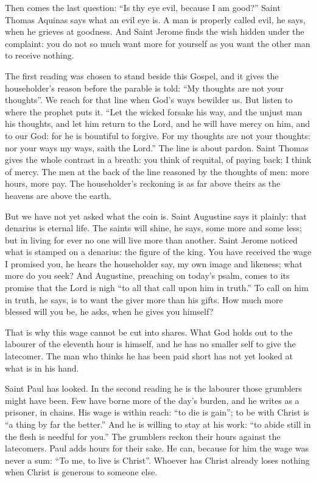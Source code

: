 Then comes the last question: ``Is thy eye evil, because I am good?'' Saint
Thomas Aquinas says what an evil eye is. A man is properly called evil, he
says, when he grieves at goodness. And Saint Jerome finds the wish hidden
under the complaint: you do not so much want more for yourself as you want
the other man to receive nothing.

\bigskip

The first reading was chosen to stand beside this Gospel, and it gives the
householder's reason before the parable is told: ``My thoughts are not your
thoughts''. We reach for that line when God's ways bewilder us. But listen to
where the prophet puts it. ``Let the wicked forsake his way, and the unjust
man his thoughts, and let him return to the Lord, and he will have mercy on
him, and to our God: for he is bountiful to forgive. For my thoughts are not
your thoughts: nor your ways my ways, saith the Lord.'' The line is about
pardon. Saint Thomas gives the whole contrast in a breath: you think of
requital, of paying back; I think of mercy. The men at the back of the line
reasoned by the thoughts of men: more hours, more pay. The householder's
reckoning is as far above theirs as the heavens are above the earth.

\bigskip

But we have not yet asked what the coin is. Saint Augustine says it plainly:
that denarius is eternal life. The saints will shine, he says, some more and
some less; but in living for ever no one will live more than another. Saint
Jerome noticed what is stamped on a denarius: the figure of the king. You
have received the wage I promised you, he hears the householder say, my own
image and likeness; what more do you seek? And Augustine, preaching on
today's psalm, comes to its promise that the Lord is nigh ``to all that call
upon him in truth.'' To call on him in truth, he says, is to want the giver
more than his gifts. How much more blessed will you be, he asks, when he
gives you himself?

That is why this wage cannot be cut into shares. What God holds out to the
labourer of the eleventh hour is himself, and he has no smaller self to give
the latecomer. The man who thinks he has been paid short has not yet looked
at what is in his hand.

Saint Paul has looked. In the second reading he is the labourer those
grumblers might have been. Few have borne more of the day's burden, and he
writes as a prisoner, in chains. His wage is within reach: ``to die is
gain''; to be with Christ is ``a thing by far the better.'' And he is willing
to stay at his work: ``to abide still in the flesh is needful for you.'' The
grumblers reckon their hours against the latecomers. Paul adds hours for
their sake. He can, because for him the wage was never a sum: ``To me, to
live is Christ''. Whoever has Christ already loses nothing when Christ is
generous to someone else.

